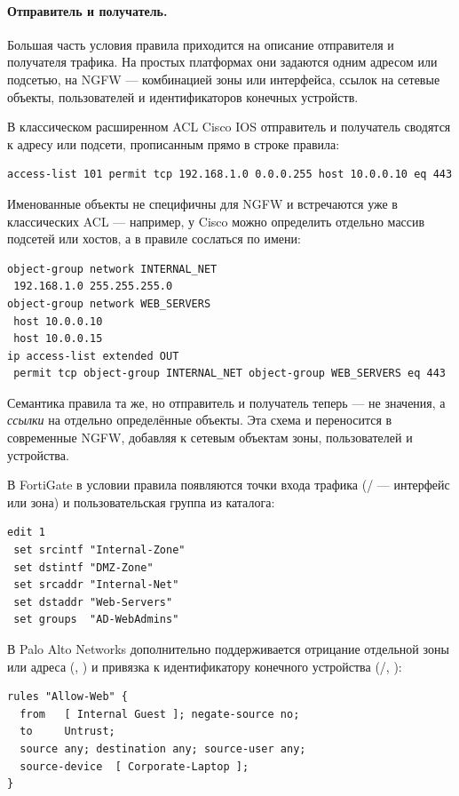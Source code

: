 \paragraph{Отправитель и получатель.} Большая часть условия правила приходится на описание отправителя и получателя трафика. На простых платформах они задаются одним адресом или подсетью, на NGFW --- комбинацией зоны или интерфейса, ссылок на сетевые объекты, пользователей и идентификаторов конечных устройств.

В классическом расширенном ACL Cisco IOS отправитель и получатель сводятся к адресу или подсети, прописанным прямо в строке правила:

\begin{verbatim}
access-list 101 permit tcp 192.168.1.0 0.0.0.255 host 10.0.0.10 eq 443
\end{verbatim}

Именованные объекты не специфичны для NGFW и встречаются уже в классических ACL --- например, у Cisco можно определить отдельно массив подсетей или хостов, а в правиле сослаться по имени:

\begin{verbatim}
object-group network INTERNAL_NET
 192.168.1.0 255.255.255.0
object-group network WEB_SERVERS
 host 10.0.0.10
 host 10.0.0.15
ip access-list extended OUT
 permit tcp object-group INTERNAL_NET object-group WEB_SERVERS eq 443
\end{verbatim}

Семантика правила та же, но отправитель и получатель теперь --- не значения, а \emph{ссылки} на отдельно определённые объекты. Эта схема и переносится в современные NGFW, добавляя к сетевым объектам зоны, пользователей и устройства.

В FortiGate в условии правила появляются точки входа трафика (/ --- интерфейс или зона) и пользовательская группа из каталога:

\begin{verbatim}
edit 1
 set srcintf "Internal-Zone"
 set dstintf "DMZ-Zone"
 set srcaddr "Internal-Net"
 set dstaddr "Web-Servers"
 set groups  "AD-WebAdmins"
\end{verbatim}

В Palo Alto Networks дополнительно поддерживается отрицание отдельной зоны или адреса (, ) и привязка к идентификатору конечного устройства (/, ):

\begin{verbatim}
rules "Allow-Web" {
  from   [ Internal Guest ]; negate-source no;
  to     Untrust;
  source any; destination any; source-user any;
  source-device  [ Corporate-Laptop ];
}
\end{verbatim}

